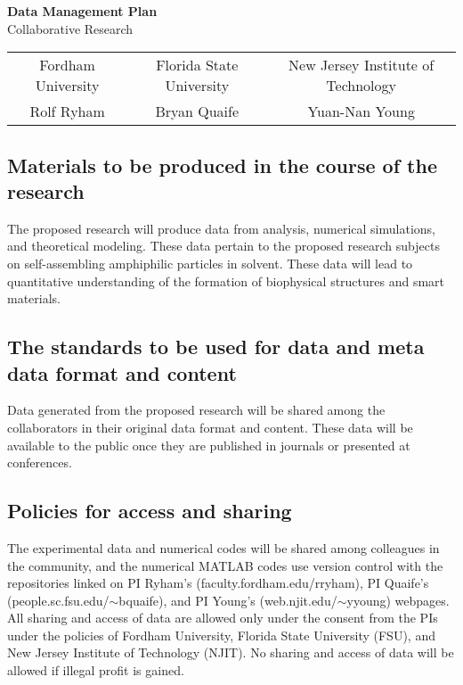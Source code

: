 \documentclass[11pt]{article}
\begin{document}
\sloppy

\begin{center}
{\Large \bf Data Management Plan}\\
Collaborative Research
\begin{tabular}{ccc}\\ 
Fordham University & Florida State University& New Jersey Institute of Technology\\
Rolf Ryham &            Bryan Quaife &              Yuan-Nan Young
\end{tabular}
\end{center}

\subsection*{Materials to be produced in the course of the research}
The proposed research will produce data from analysis, numerical
simulations, and theoretical modeling. These data pertain to the
proposed research subjects on self-assembling amphiphilic particles in
solvent. These data will lead to quantitative understanding of the
formation of biophysical structures and smart materials.

\subsection*{The standards to be used for data and meta data format and
content}
Data generated from the proposed research will be shared among the
collaborators in their original data format and content. These data will
be available to the public once they are published in journals or
presented at conferences.

\subsection*{Policies for access and sharing}
The experimental data and numerical codes will be shared among
colleagues in the community, and the numerical MATLAB codes use version
control with the repositories linked on PI Ryham's
(faculty.fordham.edu/rryham), PI Quaife's
(people.sc.fsu.edu/$\sim$bquaife), and PI Young's
(web.njit.edu/$\sim$yyoung) webpages. All sharing and access of data are
allowed only under the consent from the PIs under the policies of
Fordham University, Florida State University (FSU), and New Jersey
Institute of Technology (NJIT). No sharing and access of data will be
allowed if illegal profit is gained.
\end{document}
